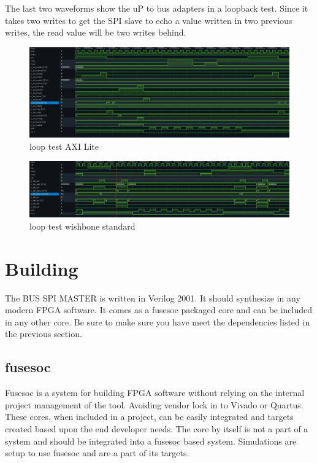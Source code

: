 \par
The last two waveforms show the uP to bus adapters in a loopback test. Since it takes two writes to get the SPI slave to
echo a value written in two previous writes, the read value will be two writes behind.
\begin{figure}[H]
\caption{loop test AXI Lite}
\centering
\includegraphics[width=\textwidth]{img/diagrams/waveform_loop_test_axil.png}
\end{figure}

\begin{figure}[H]
\caption{loop test wishbone standard}
\centering
\includegraphics[width=\textwidth]{img/diagrams/waveform_loop_test_wishbone_standard.png}
\end{figure}

\section{Building}

\par
The BUS SPI MASTER is written in Verilog 2001. It should synthesize in any modern FPGA software. It comes as a fusesoc packaged core and can be
included in any other core. Be sure to make sure you have meet the dependencies listed in the previous section.

\subsection{fusesoc}
\par
Fusesoc is a system for building FPGA software without relying on the internal project management of the tool. Avoiding vendor lock in to Vivado or Quartus.
These cores, when included in a project, can be easily integrated and targets created based upon the end developer needs. The core by itself is not a part of
a system and should be integrated into a fusesoc based system. Simulations are setup to use fusesoc and are a part of its targets.

